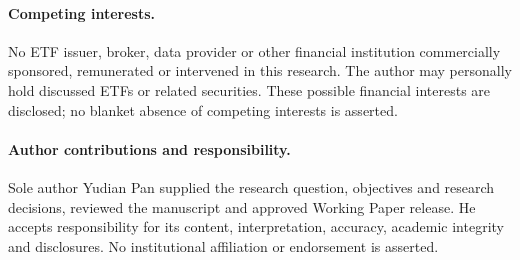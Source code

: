 \documentclass[12pt,letterpaper]{article}
\begin{document}
\paragraph{Competing interests.} No ETF issuer, broker, data provider or other financial institution commercially sponsored, remunerated or intervened in this research. The author may personally hold discussed ETFs or related securities. These possible financial interests are disclosed; no blanket absence of competing interests is asserted.
\paragraph{Author contributions and responsibility.} Sole author Yudian Pan supplied the research question, objectives and research decisions, reviewed the manuscript and approved Working Paper release. He accepts responsibility for its content, interpretation, accuracy, academic integrity and disclosures. No institutional affiliation or endorsement is asserted.
\fi
\end{document}
